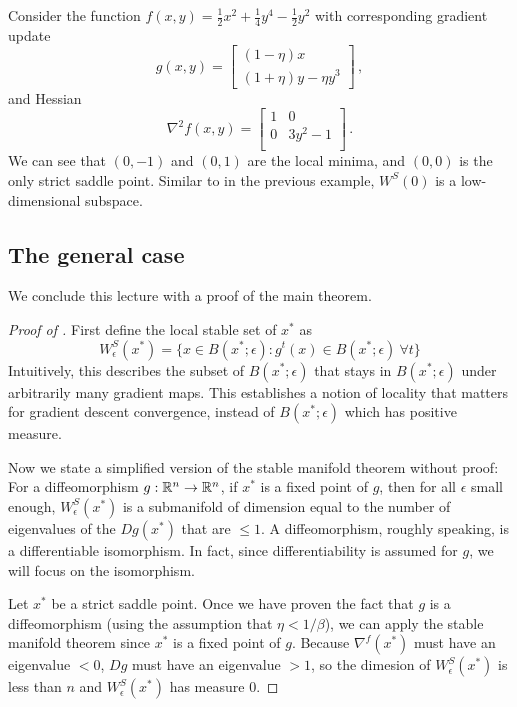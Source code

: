 \begin{example}
Consider the function 
$f(x,y) = \frac{1}{2}x^2 + \frac{1}{4}y^4 - \frac{1}{2}y^2$  with corresponding
gradient update 
\[
g(x,y) = 
\begin{bmatrix}
(1-\eta)x\\
(1+\eta)y - \eta y^3 
\end{bmatrix}\,,
\]
and Hessian
\[
\nabla^2 f(x,y) = 
 \begin{bmatrix}
1 & 0 \\
0 & 3y^2-1 \\
\end{bmatrix}\,.
\]
We can see that $(0,-1)$ and $(0,1)$ are the local minima, and $(0,0)$ is the only strict saddle point. Similar to in the previous example, $W^S(0)$ is a low-dimensional subspace. 

\subsection{The general case}

We conclude this lecture with a proof of the main theorem.

\begin{proof}[Proof of ]
First define the local stable set of $x^*$ as
$$
W^S_\epsilon(x^*) 
= \{ x\in B(x^*;\epsilon): g^t(x)\in B(x^*;\epsilon) ~\forall t \}
$$
Intuitively, this describes the subset of $B(x^*;\epsilon)$ that stays in $B(x^*;\epsilon)$ under arbitrarily many gradient maps. This establishes a notion of locality that matters for gradient descent convergence, instead of $B(x^*;\epsilon)$ which has positive measure.

Now we state a simplified version of the stable manifold theorem without proof: For a diffeomorphism $g:\mathbb{R}^n\rightarrow\mathbb{R}^n$, if $x^*$ is a fixed point of $g$, then for all $\epsilon$ small enough, $W^S_\epsilon(x^*)$ is a submanifold of dimension equal to the number of eigenvalues of the $Dg(x^*)$ that are $\leq 1$. A diffeomorphism, roughly speaking, is a differentiable isomorphism. In fact, since differentiability is assumed for $g$, we will focus on the isomorphism.

Let $x^*$ be a strict saddle point.
Once we have proven the fact that $g$ is a diffeomorphism (using the assumption that $\eta<1/\beta$), we can apply the stable manifold theorem since $x^*$ is a fixed point of $g$. 
Because $\nabla^f (x^*)$ must have an eigenvalue $<0$, $Dg$ must have an eigenvalue $>1$, so 
the dimesion of $W^S_\epsilon(x^*)$ is less than $n$ and $W^S_\epsilon(x^*)$ has measure 0. 


\end{proof}
\end{example}

